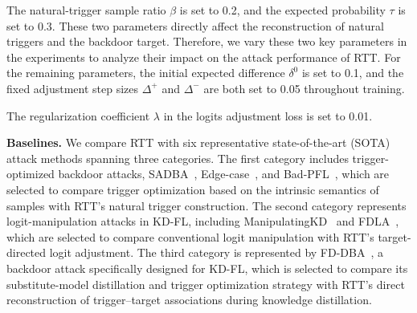 \documentclass[lettersize,journal]{IEEEtran}
\newif\ifhighlight
\newcommand{\hlone}[1]{%
    \ifhighlight{\color{reviewer1}#1}\else#1\fi
}
\newcommand{\hlshare}[1]{%
    \ifhighlight{\color{share}#1}\else#1\fi
}
\begin{document}


The natural-trigger sample ratio $\beta$ is set to 0.2, and the expected probability $\tau$ is set to 0.3.
These two parameters directly affect the reconstruction of natural triggers and the backdoor target.
Therefore, we vary these two key parameters in the experiments to analyze their impact on the attack performance of RTT.
\hlone{For the remaining parameters, the initial expected difference $\delta^0$ is set to 0.1, and the fixed adjustment step sizes $\Delta^+$ and $\Delta^-$ are both set to 0.05 throughout training.}
The regularization coefficient $\lambda$ in the logits adjustment loss is set to 0.01.

\textbf{Baselines.} \hlone{We compare RTT with six representative state-of-the-art (SOTA) attack methods spanning three categories.
The first category includes trigger-optimized backdoor attacks, SADBA~\cite{SADBA}, Edge-case~\cite{edge-case}, and Bad-PFL~\cite{Bad_PFL}, which are selected to compare trigger optimization based on the intrinsic semantics of samples with RTT's natural trigger construction.
The second category represents logit-manipulation attacks in KD-FL, including ManipulatingKD~\cite{ManipulatingKD} and FDLA~\cite{FDLA}, which are selected to compare conventional logit manipulation with RTT's target-directed logit adjustment.
The third category is represented by FD-DBA~\cite{liu2026distributed}, a backdoor attack specifically designed for KD-FL, which is selected to compare its substitute-model distillation and trigger optimization strategy with RTT's direct reconstruction of trigger–target associations during knowledge distillation.}
\end{document}
